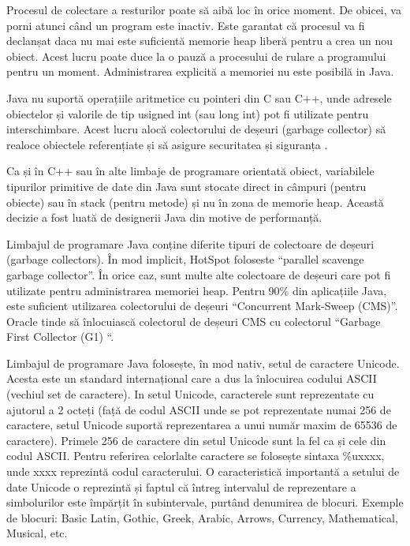 \documentclass[12pt]{book}
\begin{document}
Procesul de colectare a resturilor poate să aibă loc în orice moment. De obicei, va porni atunci când un program este inactiv. Este garantat că procesul va fi declanșat daca nu mai este suficientă memorie heap liberă pentru a crea un nou obiect. Acest lucru poate duce la o pauză a procesului de rulare a programului pentru un moment. Administrarea explicită a memoriei nu este posibilă in Java.\cite{thinkJava}

Java nu suportă operațiile aritmetice cu pointeri din C sau C++, unde adresele obiectelor și valorile de tip usigned int (sau long int) pot fi utilizate pentru interschimbare. Acest lucru alocă colectorului de deșeuri (garbage collector) să realoce obiectele referențiate și să asigure securitatea și siguranța .

Ca și în C++ sau în alte limbaje de programare orientată obiect, variabilele tipurilor primitive de date din Java sunt stocate direct in câmpuri (pentru obiecte) sau în stack (pentru metode) și nu în zona de memorie heap. Această decizie a fost luată de designerii Java din motive de performanță.

Limbajul de programare Java conține diferite tipuri de colectoare de deșeuri (garbage collectors). În mod implicit, HotSpot foloseste “parallel scavenge garbage collector”. În orice caz, sunt multe alte colectoare de deșeuri care pot fi utilizate pentru administrarea memoriei heap. Pentru 90\%  din aplicațiile Java, este suficient utilizarea colectorului de deșeuri “Concurrent Mark-Sweep (CMS)”. Oracle tinde să înlocuiască colectorul de deșeuri CMS cu colectorul “Garbage First Collector (G1) “. \cite{thinkJava}

Limbajul de programare Java folosește, în mod nativ, setul de caractere Unicode. Acesta este un standard internațional care a dus la înlocuirea codului ASCII (vechiul set de caractere). In setul Unicode, caracterele sunt reprezentate cu ajutorul a 2 octeți (față de codul ASCII unde se pot reprezentate numai 256 de caractere, setul Unicode suportă reprezentarea a unui număr maxim de 65536 de caractere). Primele 256 de caractere din setul Unicode sunt la fel ca și cele din codul ASCII. Pentru referirea celorlalte caractere se folosește sintaxa \%uxxxx, unde xxxx reprezintă codul caracterului. O caracteristică importantă a setului de date Unicode o reprezintă și faptul că întreg intervalul de reprezentare a simbolurilor este împărțit în subintervale, purtând denumirea de blocuri. Exemple de blocuri: Basic Latin, Gothic, Greek, Arabic, Arrows, Currency, Mathematical, Musical, etc. \cite{cursPracticJava}
\end{document}
